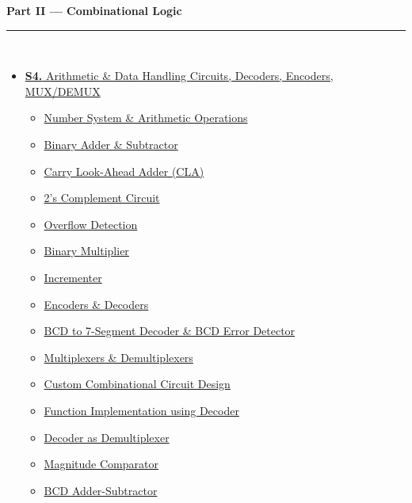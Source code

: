 \documentclass[12pt,a4paper]{article}
\begin{document}
\begin{tcolorbox}[breakable,colback=cD!5,colframe=cD,boxrule=1pt,arc=5pt,
  left=8pt,right=8pt,top=8pt,bottom=8pt,before skip=4pt]
  {\large\bfseries\textcolor{cD}{Part II --- Combinational Logic}}\\[5pt]
  \textcolor{cD!40}{\rule{\textwidth}{0.4pt}}\\[3pt]
  \small\begin{itemize}[leftmargin=1.2em,itemsep=1pt,label={\textcolor{cD}{$\triangleright$}}]
    \item \hyperref[sec:S4]{\textbf{S4.} Arithmetic \& Data Handling Circuits, Decoders, Encoders, MUX/DEMUX}
      \begin{itemize}[leftmargin=1.5em,itemsep=0pt,label={\textcolor{cD}{$\cdot$}}]
        \item \hyperref[sub:s4-number-sys]{Number System \& Arithmetic Operations}
        \item \hyperref[sub:s4-adder-sub]{Binary Adder \& Subtractor}
        \item \hyperref[sub:s4-cla]{Carry Look-Ahead Adder (CLA)}
        \item \hyperref[sub:s4-2scomp]{2's Complement Circuit}
        \item \hyperref[sub:s4-overflow]{Overflow Detection}
        \item \hyperref[sub:s4-multiplier]{Binary Multiplier}
        \item \hyperref[sub:s4-incrementer]{Incrementer}
        \item \hyperref[sub:s4-encoders]{Encoders \& Decoders}
        \item \hyperref[sub:s4-bcd]{BCD to 7-Segment Decoder \& BCD Error Detector}
        \item \hyperref[sub:s4-mux]{Multiplexers \& Demultiplexers}
        \item \hyperref[sub:s4-comb-custom]{Custom Combinational Circuit Design}
        \item \hyperref[sub:s4-decoder-func]{Function Implementation using Decoder}
        \item \hyperref[sub:s4-demux]{Decoder as Demultiplexer}
        \item \hyperref[sub:s4-comparator]{Magnitude Comparator}
        \item \hyperref[sub:s4-bcd-addsub]{BCD Adder-Subtractor}
      \end{itemize}
  \end{itemize}
\end{tcolorbox}
\end{document}
